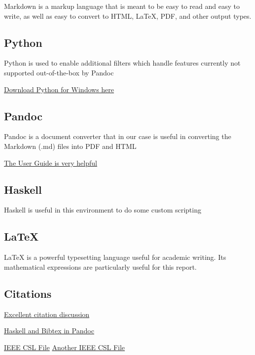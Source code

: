 \documentclass[]{article}
\begin{document}
Markdown is a markup language that is meant to be easy to read and easy
to write, as well as easy to convert to HTML, LaTeX, PDF, and other
output types.

\subsection{Python}\label{python}

Python is used to enable additional filters which handle features
currently not supported out-of-the-box by Pandoc

\href{https://www.python.org/downloads/windows/}{Download Python for
Windows here}

\subsection{Pandoc}\label{pandoc}

Pandoc is a document converter that in our case is useful in converting
the Markdown (.md) files into PDF and HTML

\href{http://pandoc.org/README.html}{The User Guide is very helpful}

\subsection{Haskell}\label{haskell}

Haskell is useful in this environment to do some custom scripting

\subsection{LaTeX}\label{latex}

LaTeX is a powerful typesetting language useful for academic writing.
Its mathematical expressions are particularly useful for this report.

\subsection{Citations}\label{citations}

\href{http://www.chriskrycho.com/2015/academic-markdown-and-citations.html}{Excellent
citation discussion}

\href{http://blog.wuzzeb.org/posts/2012-06-15-bibtex-and-pandoc.html}{Haskell
and Bibtex in Pandoc}

\href{https://gist.github.com/marcelofernandez/3264858}{IEEE CSL File}
\href{https://gist.github.com/dnguyen85/d41b0f0bba387c1c31b7}{Another
IEEE CSL File}
\end{document}
